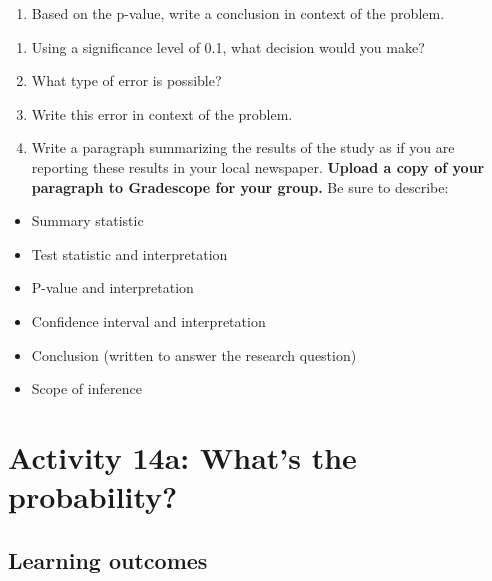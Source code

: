 \documentclass[
]{report}
\providecommand{\tightlist}{%
  \setlength{\itemsep}{0pt}\setlength{\parskip}{0pt}}
\begin{document}
\begin{enumerate}
\def\labelenumi{\arabic{enumi}.}
\setcounter{enumi}{12}
\tightlist
\item
  Based on the p-value, write a conclusion in context of the problem.
\end{enumerate}

\vspace{.8in}

\begin{enumerate}
\def\labelenumi{\arabic{enumi}.}
\setcounter{enumi}{13}
\item
  Using a significance level of 0.1, what decision would you make?
  \vspace{0.2in}
\item
  What type of error is possible?
  \vspace{0.3in}
\item
  Write this error in context of the problem.
  \vspace{0.8in}
\item
  Write a paragraph summarizing the results of the study as if you are reporting these results in your local newspaper. \textbf{Upload a copy of your paragraph to Gradescope for your group.} Be sure to describe:
\end{enumerate}

\begin{itemize}
\item
  Summary statistic
\item
  Test statistic and interpretation
\item
  P-value and interpretation
\item
  Confidence interval and interpretation
\item
  Conclusion (written to answer the research question)
\item
  Scope of inference
\end{itemize}

\vspace{3in}

\newpage

\hypertarget{activity-14a-whats-the-probability}{%
\section{Activity 14a: What's the probability?}\label{activity-14a-whats-the-probability}}


\hypertarget{learning-outcomes-9}{%
\subsection{Learning outcomes}\label{learning-outcomes-9}}
\end{document}
